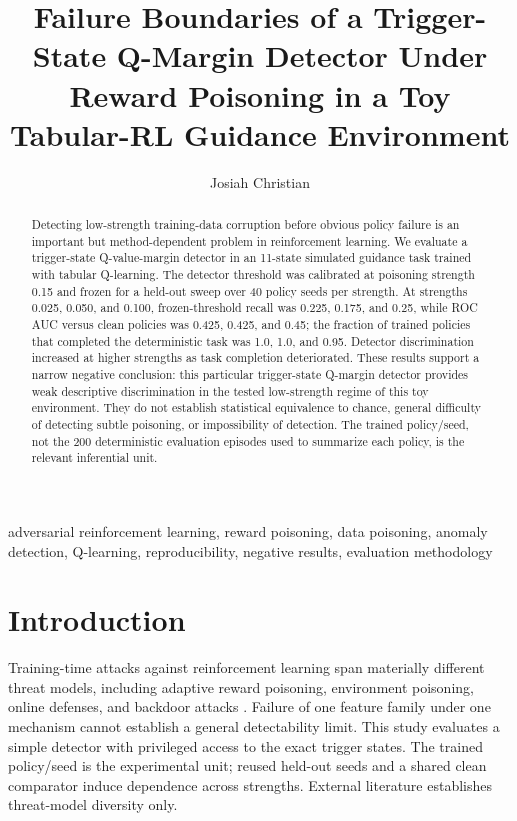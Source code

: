 \documentclass{ieeeaccess}
\begin{document}
\title{Failure Boundaries of a Trigger-State Q-Margin Detector Under Reward Poisoning in a Toy Tabular-RL Guidance Environment}
\author{Josiah Christian}
\address{Computer Science, Laurel Ridge Community College, 173 Skirmisher Lane, Middletown, VA 22645, USA}
\begin{abstract}Detecting low-strength training-data corruption before obvious policy failure is an important but method-dependent problem in reinforcement learning. We evaluate a trigger-state Q-value-margin detector in an 11-state simulated guidance task trained with tabular Q-learning. The detector threshold was calibrated at poisoning strength 0.15 and frozen for a held-out sweep over 40 policy seeds per strength. At strengths 0.025, 0.050, and 0.100, frozen-threshold recall was 0.225, 0.175, and 0.25, while ROC AUC versus clean policies was 0.425, 0.425, and 0.45; the fraction of trained policies that completed the deterministic task was 1.0, 1.0, and 0.95. Detector discrimination increased at higher strengths as task completion deteriorated. These results support a narrow negative conclusion: this particular trigger-state Q-margin detector provides weak descriptive discrimination in the tested low-strength regime of this toy environment. They do not establish statistical equivalence to chance, general difficulty of detecting subtle poisoning, or impossibility of detection. The trained policy/seed, not the 200 deterministic evaluation episodes used to summarize each policy, is the relevant inferential unit.\end{abstract}
\begin{keywords}adversarial reinforcement learning, reward poisoning, data poisoning, anomaly detection, Q-learning, reproducibility, negative results, evaluation methodology\end{keywords}\titlepgskip=-15pt\maketitle
\section{Introduction} Training-time attacks against reinforcement learning span materially different threat models, including adaptive reward poisoning, environment poisoning, online defenses, and backdoor attacks \cite{zhang2020adaptive,rakhsha2020policy,nika2023online,rathbun2025adversarial}. Failure of one feature family under one mechanism cannot establish a general detectability limit. This study evaluates a simple detector with privileged access to the exact trigger states. The trained policy/seed is the experimental unit; reused held-out seeds and a shared clean comparator induce dependence across strengths. External literature establishes threat-model diversity only.
\end{document}
